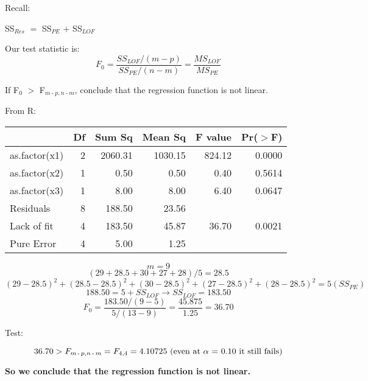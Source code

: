 \documentclass{article}
\newcommand{\mt}[1]{\ensuremath{#1}}
\newcommand{\afa}{\mt{\alpha} }
\newcommand{\lra}{ \mt{\longrightarrow} } %
\newcommand{\ps}{\mt{\operatorname{+}} }
\newcommand{\ms}{\mt{\operatorname{-}} }
\newcommand{\gr}{\mt{\operatorname{>}} }
\newcommand{\eql}{ \mt{\operatorname{=}} }
\newcommand{\uw}[2]{#1\mt{_{#2}}}
\newcommand{\eqn}[1]{\[#1\]}
\begin{document}
{{Recall:

\uw{SS}{Res} \eql \uw{SS}{PE} \ps \uw{SS}{LOF}

Our test statistic is:
\eqn{F_0 = \frac{SS_{LOF} / (m - p)}{SS_{PE} / (n - m)} = \frac{MS_{LOF}}{MS_{PE}}}

If \uw{F}{0} \gr \uw{F}{m \ms p, n \ms m}, conclude that the regression function is not linear.

From R:

\begin{table}[ht]
\centering
\begin{tabular}{lrrrrr}
  \hline
 & Df & Sum Sq & Mean Sq & F value & Pr($>$F) \\ 
  \hline
as.factor(x1) & 2 & 2060.31 & 1030.15 & 824.12 & 0.0000 \\ 
  as.factor(x2) & 1 & 0.50 & 0.50 & 0.40 & 0.5614 \\ 
  as.factor(x3) & 1 & 8.00 & 8.00 & 6.40 & 0.0647 \\ 
  Residuals & 8 & 188.50 & 23.56 &  &  \\ 
   Lack of fit & 4 & 183.50 & 45.87 & 36.70 & 0.0021 \\ 
   Pure Error & 4 & 5.00 & 1.25 &  &  \\ 
   \hline
\end{tabular}
\end{table}

\eqn{m = 9}
\eqn{(29 + 28.5 + 30 + 27 + 28) / 5 = 28.5}
\eqn{(29 - 28.5)^2 + (28.5 - 28.5)^2 + (30 - 28.5)^2 + (27 - 28.5)^2 + (28 - 28.5)^2 \eql 5 (SS_{PE})}
\eqn{188.50 = 5 + SS_{LOF} \lra SS_{LOF} = 183.50}
\eqn{F_0 = \frac{183.50 / (9 - 5)}{5 / (13 - 9)} = \frac{45.875}{1.25} = 36.70}

Test:

\eqn{36.70 > \uw{F}{m \ms p, n \ms m} = F_{4, 4} = 4.10725 \textrm{ (even at \afa \eql 0.10 it still fails)}}

\textbf{So we conclude that the regression function is not linear.}

}

}

\newpage
\end{document}
